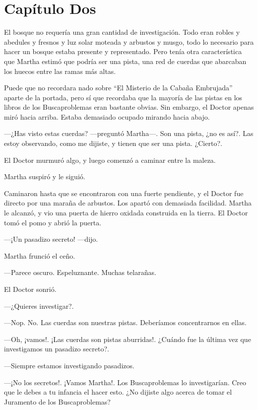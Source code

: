 \chapter*{Capítulo Dos}

El bosque no requería una gran cantidad de investigación. Todo eran robles y abedules y fresnos y luz solar moteada y arbustos y musgo, todo lo necesario para hacer un bosque estaba presente y representado. Pero tenía otra característica que Martha estimó que podría ser una pista, una red de cuerdas que abarcaban los huecos entre las ramas más altas.

Puede que no recordara nado sobre ``El Misterio de la Cabaña Embrujada'' aparte de la portada, pero sí que recordaba que la mayoría de las pistas en los libros de los Buscaproblemas eran bastante obvias. Sin embargo, el Doctor apenas miró hacia arriba. Estaba demasiado ocupado mirando hacia abajo.

---¿Has visto estas cuerdas? ---preguntó Martha---. Son una pista, ¿no es así?. Las estoy observando, como me dijiste, y tienen que ser una pista. ¿Cierto?.

El Doctor murmuró algo, y luego comenzó a caminar entre la maleza.

Martha suspiró y le siguió.

Caminaron hasta que se encontraron con una fuerte pendiente, y el Doctor fue directo por una maraña de arbustos. Los apartó con demasiada facilidad. Martha le alcanzó, y vio una puerta de hierro oxidada construida en la tierra. El Doctor tomó el pomo y abrió la puerta.

---¡Un pasadizo secreto! ---dijo.

Martha frunció el ceño.

---Parece oscuro. Espeluznante. Muchas telarañas.

El Doctor sonrió.

---¿Quieres investigar?.

---Nop. No. Las cuerdas son nuestras pistas. Deberíamos concentrarnos en ellas.

---Oh, ¡vamos!. ¡Las cuerdas son pistas aburridas!. ¿Cuándo fue la última vez que investigamos un pasadizo secreto?.

---Siempre estamos investigando pasadizos.

---¡No los secretos!. ¡Vamos Martha!. Los Buscaproblemas lo investigarían. Creo que le debes a tu infancia el hacer esto. ¿No dijiste algo acerca de tomar el Juramento de los Buscaproblemas?

